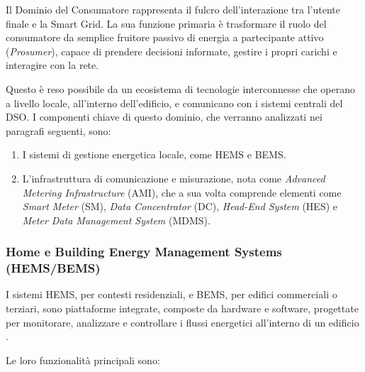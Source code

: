 Il Dominio del Consumatore rappresenta il fulcro dell'interazione tra l'utente finale e la Smart Grid. La sua funzione primaria è trasformare il ruolo del consumatore da semplice fruitore passivo di energia a partecipante attivo (\textit{Prosumer}), capace di prendere decisioni informate, gestire i propri carichi e interagire con la rete.


Questo è reso possibile da un ecosistema di tecnologie interconnesse che operano a livello locale, all'interno dell'edificio, e comunicano con i sistemi centrali del DSO. I componenti chiave di questo dominio, che verranno analizzati nei paragrafi seguenti, sono:


\begin{enumerate}
    \item I sistemi di gestione energetica locale, come HEMS e BEMS.
    
    \item L'infrastruttura di comunicazione e misurazione, nota come \textit{Advanced Metering Infrastructure} (AMI), che a sua volta comprende elementi come \textit{Smart Meter} (SM), \textit{Data Concentrator} (DC), \textit{Head-End System} (HES) e \textit{Meter Data Management System} (MDMS).
\end{enumerate}



\subsubsection{Home e Building Energy Management Systems (HEMS/BEMS)}




I sistemi HEMS, per contesti residenziali, e BEMS, per edifici commerciali o terziari, sono piattaforme integrate, composte da hardware e software, progettate per monitorare, analizzare e controllare i flussi energetici all'interno di un edificio \cite{HEMS-SE}.


Le loro funzionalità principali sono:

